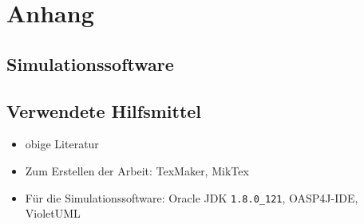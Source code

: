 \section*{Anhang}
\subsection*{Simulationssoftware}
\steffen

\subsection*{Verwendete Hilfsmittel}
\begin{itemize}
	\item obige Literatur
	\item Zum Erstellen der Arbeit: TexMaker, MikTex
	\item Für die Simulationssoftware: Oracle JDK \texttt{1.8.0\_121}, OASP4J-IDE, VioletUML
\end{itemize}